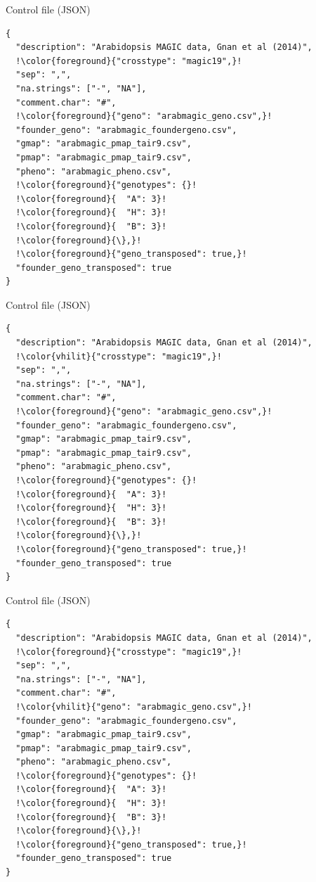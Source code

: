 \documentclass[12pt,t,aspectratio=1610]{beamer}
\begin{document}
\begin{frame}[c,fragile]{Control file (JSON)}
\begin{semiverbatim} \begin{lstlisting}[escapechar=!,]
{
  "description": "Arabidopsis MAGIC data, Gnan et al (2014)",
  !\color{foreground}{"crosstype": "magic19",}!
  "sep": ",",
  "na.strings": ["-", "NA"],
  "comment.char": "#",
  !\color{foreground}{"geno": "arabmagic_geno.csv",}!
  "founder_geno": "arabmagic_foundergeno.csv",
  "gmap": "arabmagic_pmap_tair9.csv",
  "pmap": "arabmagic_pmap_tair9.csv",
  "pheno": "arabmagic_pheno.csv",
  !\color{foreground}{"genotypes": {}!
  !\color{foreground}{  "A": 3}!
  !\color{foreground}{  "H": 3}!
  !\color{foreground}{  "B": 3}!
  !\color{foreground}{\},}!
  !\color{foreground}{"geno_transposed": true,}!
  "founder_geno_transposed": true
}
\end{lstlisting} \end{semiverbatim}
\end{frame}


\begin{frame}[c,fragile]{Control file (JSON)}
\addtocounter{framenumber}{-1}
\begin{semiverbatim} \begin{lstlisting}[escapechar=!]
{
  "description": "Arabidopsis MAGIC data, Gnan et al (2014)",
  !\color{vhilit}{"crosstype": "magic19",}!
  "sep": ",",
  "na.strings": ["-", "NA"],
  "comment.char": "#",
  !\color{foreground}{"geno": "arabmagic_geno.csv",}!
  "founder_geno": "arabmagic_foundergeno.csv",
  "gmap": "arabmagic_pmap_tair9.csv",
  "pmap": "arabmagic_pmap_tair9.csv",
  "pheno": "arabmagic_pheno.csv",
  !\color{foreground}{"genotypes": {}!
  !\color{foreground}{  "A": 3}!
  !\color{foreground}{  "H": 3}!
  !\color{foreground}{  "B": 3}!
  !\color{foreground}{\},}!
  !\color{foreground}{"geno_transposed": true,}!
  "founder_geno_transposed": true
}
\end{lstlisting} \end{semiverbatim}
\end{frame}



\begin{frame}[c,fragile]{Control file (JSON)}
\addtocounter{framenumber}{-1}
\begin{semiverbatim} \begin{lstlisting}[escapechar=!]
{
  "description": "Arabidopsis MAGIC data, Gnan et al (2014)",
  !\color{foreground}{"crosstype": "magic19",}!
  "sep": ",",
  "na.strings": ["-", "NA"],
  "comment.char": "#",
  !\color{vhilit}{"geno": "arabmagic_geno.csv",}!
  "founder_geno": "arabmagic_foundergeno.csv",
  "gmap": "arabmagic_pmap_tair9.csv",
  "pmap": "arabmagic_pmap_tair9.csv",
  "pheno": "arabmagic_pheno.csv",
  !\color{foreground}{"genotypes": {}!
  !\color{foreground}{  "A": 3}!
  !\color{foreground}{  "H": 3}!
  !\color{foreground}{  "B": 3}!
  !\color{foreground}{\},}!
  !\color{foreground}{"geno_transposed": true,}!
  "founder_geno_transposed": true
}
\end{lstlisting} \end{semiverbatim}
\end{frame}
\end{document}
